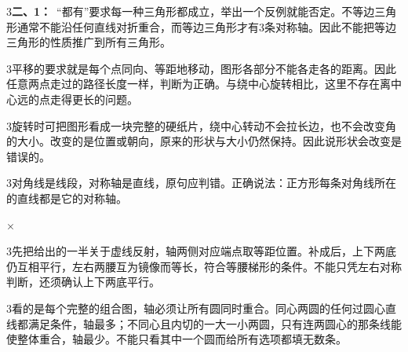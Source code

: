 \documentclass[multi=snippet,border={5bp 20bp 5bp 5bp}]{standalone}
\newenvironment{snippet}[3]{\begin{minipage}{#1bp}\color{answerred}\fontsize{#2}{#3}\selectfont\raggedright}{\end{minipage}}
\begin{document}
\begin{snippet}{505}{11.5}{14}\begin{multicols}{3}\raggedcolumns \textbf{二、1：}\ “都有”要求每一种三角形都成立，举出一个反例就能否定。不等边三角形通常不能沿任何直线对折重合，而等边三角形才有3条对称轴。因此不能把等边三角形的性质推广到所有三角形。\end{multicols}\end{snippet}
\begin{snippet}{505}{11.5}{14}\begin{multicols}{3}\raggedcolumns 平移的要求就是每个点同向、等距地移动，图形各部分不能各走各的距离。因此任意两点走过的路径长度一样，判断为正确。与绕中心旋转相比，这里不存在离中心远的点走得更长的问题。\end{multicols}\end{snippet}
\begin{snippet}{505}{11.5}{14}\begin{multicols}{3}\raggedcolumns 旋转时可把图形看成一块完整的硬纸片，绕中心转动不会拉长边，也不会改变角的大小。改变的是位置或朝向，原来的形状与大小仍然保持。因此说形状会改变是错误的。\end{multicols}\end{snippet}
\begin{snippet}{505}{11.5}{14}\begin{multicols}{3}\raggedcolumns 对角线是线段，对称轴是直线，原句应判错。正确说法：正方形每条对角线所在的直线都是它的对称轴。\end{multicols}\end{snippet}
\begin{snippet}{9.800000000000011}{10.5}{12.8}\SourceSans\setlength{\mathindent}{2bp}\(\times\)\end{snippet}
\begin{snippet}{505}{11.5}{14}\begin{multicols}{3}\raggedcolumns 先把给出的一半关于虚线反射，轴两侧对应端点取等距位置。补成后，上下两底仍互相平行，左右两腰互为镜像而等长，符合等腰梯形的条件。不能只凭左右对称判断，还须确认上下两底平行。\end{multicols}\end{snippet}
\begin{snippet}{505}{11.5}{14}\begin{multicols}{3}\raggedcolumns 看的是每个完整的组合图，轴必须让所有圆同时重合。同心两圆的任何过圆心直线都满足条件，轴最多；不同心且内切的一大一小两圆，只有连两圆心的那条线能使整体重合，轴最少。不能只看其中一个圆而给所有选项都填无数条。\end{multicols}\end{snippet}
\end{document}
